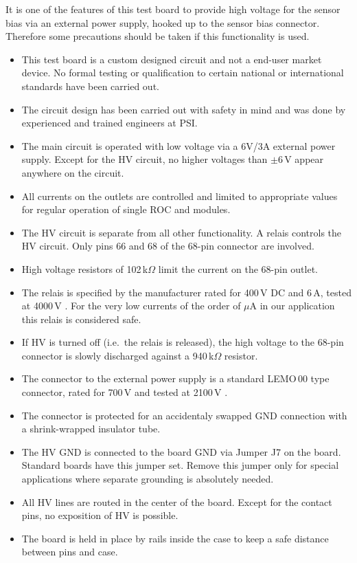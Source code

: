 It is one of the features of this test board to provide high voltage for the sensor bias via an external power supply, hooked up to the sensor bias connector. Therefore some precautions should be taken if this functionality is used.
\begin{itemize}
    \item This test board is a custom designed circuit and not a end-user market device. No formal testing or qualification to certain national or international standards have been carried out.
    \item The circuit design has been carried out with safety in mind and was done by experienced and trained engineers at PSI.
    \item The main circuit is operated with low voltage via a 6V/3A external power supply. Except for the HV circuit, no higher voltages than $\pm$6\,V appear anywhere on the circuit.
    \item All currents on the outlets are controlled and limited to appropriate values for regular operation of single ROC and modules.
    \item The HV circuit is separate from all other functionality. A relais controls the HV circuit. Only pins 66 and 68 of the 68-pin connector are involved.
    \item High voltage resistors of 102\,k$\Omega$ limit the current on the 68-pin outlet.
    \item The relais is specified by the manufacturer rated for 400\,V DC and 6\,A, tested at 4000\,V \cite{finderRelais}. For the very low currents of the order of $\mu$A in our application this relais is considered safe.
    \item If HV is turned off (i.e.~the relais is released), the high voltage to the 68-pin connector is slowly discharged against a 940\,k$\Omega$ resistor.
    \item The connector to the external power supply is a standard LEMO\,00 type connector, rated for 700\,V and tested at 2100\,V \cite{lemoConnector}.
    \item The connector is protected for an accidentaly swapped GND connection with a shrink-wrapped insulator tube.
    \item The HV GND is connected to the board GND via Jumper J7 on the board. Standard boards have this jumper set. Remove this jumper only for special applications where separate grounding is absolutely needed.
    \item All HV lines are routed in the center of the board. Except for the contact pins, no exposition of HV is possible.
    \item The board is held in place by rails inside the case to keep a safe distance between pins and case.
\end{itemize}

